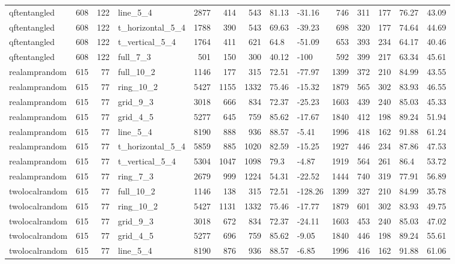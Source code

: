 \begin{longtable}{lrrlrrrllrrrll}
qftentangled & 608 & 122 & line\_5\_4 & 2877 & 414 & 543 & 81.13 & -31.16 & 746 & 311 & 177 & 76.27 & 43.09 \\
qftentangled & 608 & 122 & t\_horizontal\_5\_4 & 1788 & 390 & 543 & 69.63 & -39.23 & 698 & 320 & 177 & 74.64 & 44.69 \\
qftentangled & 608 & 122 & t\_vertical\_5\_4 & 1764 & 411 & 621 & 64.8 & -51.09 & 653 & 393 & 234 & 64.17 & 40.46 \\
qftentangled & 608 & 122 & full\_7\_3 & 501 & 150 & 300 & 40.12 & -100 & 592 & 399 & 217 & 63.34 & 45.61 \\
realamprandom & 615 & 77 & full\_10\_2 & 1146 & 177 & 315 & 72.51 & -77.97 & 1399 & 372 & 210 & 84.99 & 43.55 \\
realamprandom & 615 & 77 & ring\_10\_2 & 5427 & 1155 & 1332 & 75.46 & -15.32 & 1879 & 565 & 302 & 83.93 & 46.55 \\
realamprandom & 615 & 77 & grid\_9\_3 & 3018 & 666 & 834 & 72.37 & -25.23 & 1603 & 439 & 240 & 85.03 & 45.33 \\
realamprandom & 615 & 77 & grid\_4\_5 & 5277 & 645 & 759 & 85.62 & -17.67 & 1840 & 412 & 198 & 89.24 & 51.94 \\
realamprandom & 615 & 77 & line\_5\_4 & 8190 & 888 & 936 & 88.57 & -5.41 & 1996 & 418 & 162 & 91.88 & 61.24 \\
realamprandom & 615 & 77 & t\_horizontal\_5\_4 & 5859 & 885 & 1020 & 82.59 & -15.25 & 1927 & 446 & 234 & 87.86 & 47.53 \\
realamprandom & 615 & 77 & t\_vertical\_5\_4 & 5304 & 1047 & 1098 & 79.3 & -4.87 & 1919 & 564 & 261 & 86.4 & 53.72 \\
realamprandom & 615 & 77 & ring\_7\_3 & 2679 & 999 & 1224 & 54.31 & -22.52 & 1444 & 740 & 319 & 77.91 & 56.89 \\
twolocalrandom & 615 & 77 & full\_10\_2 & 1146 & 138 & 315 & 72.51 & -128.26 & 1399 & 327 & 210 & 84.99 & 35.78 \\
twolocalrandom & 615 & 77 & ring\_10\_2 & 5427 & 1131 & 1332 & 75.46 & -17.77 & 1879 & 601 & 302 & 83.93 & 49.75 \\
twolocalrandom & 615 & 77 & grid\_9\_3 & 3018 & 672 & 834 & 72.37 & -24.11 & 1603 & 453 & 240 & 85.03 & 47.02 \\
twolocalrandom & 615 & 77 & grid\_4\_5 & 5277 & 696 & 759 & 85.62 & -9.05 & 1840 & 446 & 198 & 89.24 & 55.61 \\
twolocalrandom & 615 & 77 & line\_5\_4 & 8190 & 876 & 936 & 88.57 & -6.85 & 1996 & 416 & 162 & 91.88 & 61.06 \\

\end{longtable}

